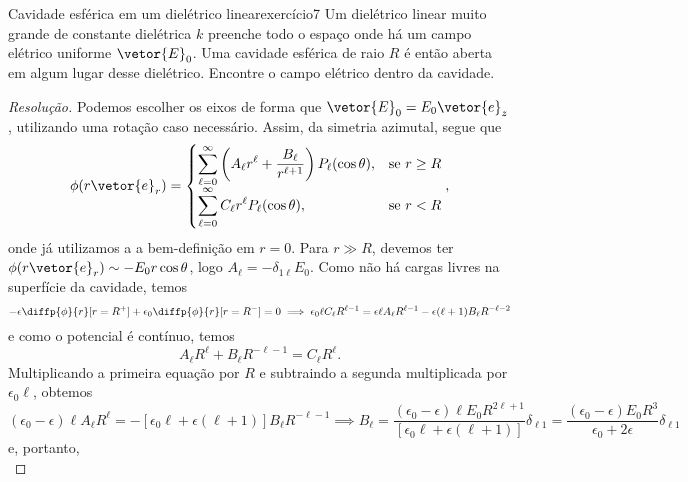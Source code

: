 \begin{exercício}{Cavidade esférica em um dielétrico linear}{exercício7}
    Um dielétrico linear muito grande de constante dielétrica \(k\) preenche todo o espaço onde há um campo elétrico uniforme \(\vetor{E}_0\). Uma cavidade esférica de raio \(R\) é então aberta em algum lugar desse dielétrico. Encontre o campo elétrico dentro da cavidade.
\end{exercício}
\begin{proof}[Resolução]
    Podemos escolher os eixos de forma que \(\vetor{E}_0 = E_0 \vetor{e}_z\), utilizando uma rotação caso necessário. Assim, da simetria azimutal, segue que
    \begin{equation*}
        \phi(r\vetor{e}_r) = \begin{cases}
            \displaystyle \sum_{\ell = 0}^\infty \left(A_\ell r^\ell + \frac{B_\ell}{r^{\ell + 1}}\right) P_\ell(\cos\theta), &\text{se }r \geq R\\
            \displaystyle \sum_{\ell = 0}^\infty C_\ell r^\ell P_\ell(\cos\theta),&\text{se }r < R
        \end{cases},
    \end{equation*}
    onde já utilizamos a a bem-definição em \(r = 0\). Para \(r \gg R\), devemos ter \(\phi(r\vetor{e}_r)\sim -E_0 r\cos\theta\), logo \(A_\ell = -\delta_{1\ell} E_0\). Como não há cargas livres na superfície da cavidade, temos
    \begin{equation*}
        -\epsilon\diffp{\phi}{r}[r = R^+] + \epsilon_0 \diffp{\phi}{r}[r = R^-] = 0 \implies \epsilon_0 \ell C_\ell R^{\ell - 1} = \epsilon \ell A_\ell R^{\ell - 1} - \epsilon (\ell + 1) B_\ell R^{-\ell - 2}
    \end{equation*}
    e como o potencial é contínuo, temos
    \begin{equation*}
        A_\ell R^\ell + B_\ell R^{-\ell - 1} = C_\ell R^\ell.
    \end{equation*}
    Multiplicando a primeira equação por \(R\) e subtraindo a segunda multiplicada por \(\epsilon_0 \ell\), obtemos
    \begin{equation*}
        (\epsilon_0 - \epsilon)\ell A_\ell R^\ell = -\left[\epsilon_0 \ell + \epsilon(\ell + 1)\right] B_\ell R^{-\ell - 1} \implies B_\ell = \frac{(\epsilon_0 - \epsilon)\ell E_0 R^{2\ell + 1}}{\left[\epsilon_0 \ell + \epsilon(\ell + 1)\right]}\delta_{\ell 1} = \frac{(\epsilon_0 - \epsilon) E_0 R^{3}}{\epsilon_0 + 2\epsilon}\delta_{\ell 1}
    \end{equation*}
    e, portanto,
    \begin{equation*}

\end{equation*}
\end{proof}
